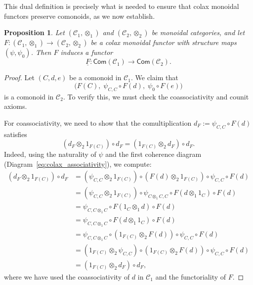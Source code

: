 \documentclass{amsart}
\newtheorem{proposition}{Proposition}[section]
\begin{document}
This dual definition is precisely what is needed to ensure that colax monoidal functors preserve comonoids, as we now establish.

\begin{proposition}\label{prop:colax_lifts_comonoids}
Let $(\mathcal{C}_1, \otimes_1)$ and $(\mathcal{C}_2, \otimes_2)$ be monoidal categories, and let $F \colon (\mathcal{C}_1, \otimes_1) \longrightarrow (\mathcal{C}_2, \otimes_2)$ be a colax monoidal functor with structure maps $(\psi, \psi_0)$. Then $F$ induces a functor
\[
\underline{F} \colon \mathsf{Com}(\mathcal{C}_1) \longrightarrow \mathsf{Com}(\mathcal{C}_2).
\]
\end{proposition}

\begin{proof}
Let $(C, d, e)$ be a comonoid in $\mathcal{C}_1$. We claim that
\[
\bigl( F(C),\; \psi_{C,C} \circ F(d),\; \psi_0 \circ F(e) \bigr)
\]
is a comonoid in $\mathcal{C}_2$. To verify this, we must check the coassociativity and counit axioms.

For coassociativity, we need to show that the comultiplication $d_F := \psi_{C,C} \circ F(d)$ satisfies
\[
(d_F \otimes_2 1_{F(C)}) \circ d_F = (1_{F(C)} \otimes_2 d_F) \circ d_F.
\]
Indeed, using the naturality of $\psi$ and the first coherence diagram (Diagram~\ref{eq:colax_associativity}), we compute:
\begin{align*}
(d_F \otimes_2 1_{F(C)}) \circ d_F
&= (\psi_{C,C} \otimes_2 1_{F(C)}) \circ (F(d) \otimes_2 1_{F(C)}) \circ \psi_{C,C} \circ F(d) \\
&= (\psi_{C,C} \otimes_2 1_{F(C)}) \circ \psi_{C \otimes_1 C, C} \circ F(d \otimes_1 1_C) \circ F(d) \\
&= \psi_{C, C \otimes_1 C} \circ F(1_C \otimes_1 d) \circ F(d) \\
&= \psi_{C, C \otimes_1 C} \circ F(d \otimes_1 1_C) \circ F(d) \\
&= \psi_{C, C \otimes_1 C} \circ (1_{F(C)} \otimes_2 F(d)) \circ \psi_{C,C} \circ F(d) \\
&= (1_{F(C)} \otimes_2 \psi_{C,C}) \circ (1_{F(C)} \otimes_2 F(d)) \circ \psi_{C,C} \circ F(d) \\
&= (1_{F(C)} \otimes_2 d_F) \circ d_F,
\end{align*}
where we have used the coassociativity of $d$ in $\mathcal{C}_1$ and the functoriality of $F$.


\end{proof}
\end{document}
